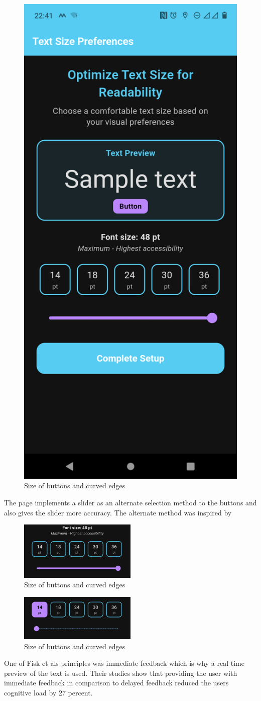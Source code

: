 \documentclass[]{project_final}
\begin{document}
\begin{figure}[ht!]
  \centering
  \includegraphics[height=0.5\textwidth]{M Font Size 2.png}
  \caption{Size of buttons and curved edges}
  \label{fig:1}
\end{figure}

The page implements a slider as an alternate selection method to the buttons and also gives the slider more accuracy. The alternate method was inspired by

\begin{figure}[ht!]
  \centering
  \includegraphics[width=0.5\textwidth]{M slider zoom.png}
  \caption{Size of buttons and curved edges}
  \label{fig:1}
\end{figure}

\begin{figure}[ht!]
  \centering
  \includegraphics[width=0.5\textwidth]{M slide zoom 2.png}
  \caption{Size of buttons and curved edges}
  \label{fig:1}
\end{figure}

One of Fisk et als principles was immediate feedback which is why a real time preview of the text is used. Their studies show that providing the user with immediate feedback in comparison to delayed feedback reduced the users cognitive load by 27 percent.
\end{document}
